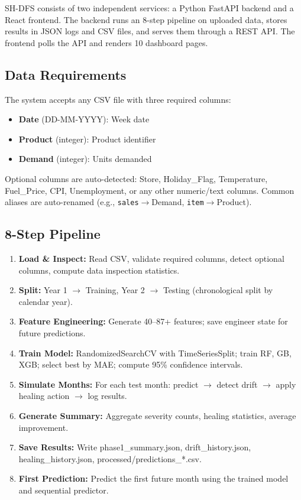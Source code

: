 \documentclass[conference]{IEEEtran}
\begin{document}
SH-DFS consists of two independent services: a Python FastAPI backend and a React frontend. The backend runs an 8-step pipeline on uploaded data, stores results in JSON logs and CSV files, and serves them through a REST API. The frontend polls the API and renders 10 dashboard pages.

\subsection{Data Requirements}

The system accepts any CSV file with three required columns:

\begin{itemize}
    \item \textbf{Date} (DD-MM-YYYY): Week date
    \item \textbf{Product} (integer): Product identifier
    \item \textbf{Demand} (integer): Units demanded
\end{itemize}

Optional columns are auto-detected: Store, Holiday\_Flag, Temperature, Fuel\_Price, CPI, Unemployment, or any other numeric/text columns. Common aliases are auto-renamed (e.g., \texttt{sales}$\rightarrow$Demand, \texttt{item}$\rightarrow$Product).

\subsection{8-Step Pipeline}

\begin{enumerate}
    \item \textbf{Load \& Inspect:} Read CSV, validate required columns, detect optional columns, compute data inspection statistics.
    \item \textbf{Split:} Year 1 $\rightarrow$ Training, Year 2 $\rightarrow$ Testing (chronological split by calendar year).
    \item \textbf{Feature Engineering:} Generate 40--87+ features; save engineer state for future predictions.
    \item \textbf{Train Model:} RandomizedSearchCV with TimeSeriesSplit; train RF, GB, XGB; select best by MAE; compute 95\% confidence intervals.
    \item \textbf{Simulate Months:} For each test month: predict $\rightarrow$ detect drift $\rightarrow$ apply healing action $\rightarrow$ log results.
    \item \textbf{Generate Summary:} Aggregate severity counts, healing statistics, average improvement.
    \item \textbf{Save Results:} Write phase1\_summary.json, drift\_history.json, healing\_history.json, processed/predictions\_*.csv.
    \item \textbf{First Prediction:} Predict the first future month using the trained model and sequential predictor.
\end{enumerate}
\end{document}
